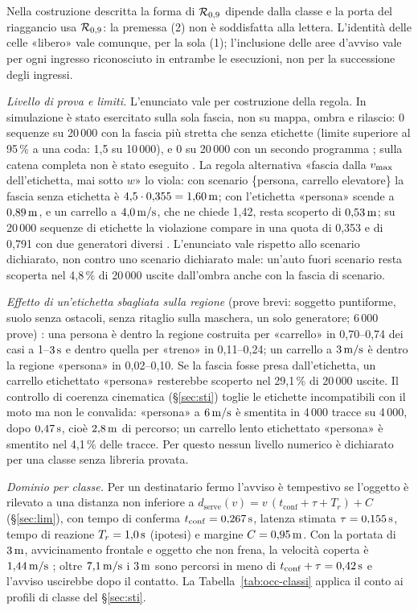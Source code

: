Nella costruzione descritta la forma di $\mathcal{R}_{0,9}$ dipende dalla classe e la porta del riaggancio usa $\mathcal{R}_{0,9}$: la premessa (2) non è soddisfatta alla lettera. L'identità delle celle «libero» vale comunque, per la sola (1); l'inclusione delle aree d'avviso vale per ogni ingresso riconosciuto in entrambe le esecuzioni, non per la successione degli ingressi.

\emph{Livello di prova e limiti.} L'enunciato vale per costruzione della regola. In simulazione è stato esercitato sulla sola fascia, non su mappa, ombra e rilascio: 0 sequenze su 20\,000 con la fascia più stretta che senza etichette (limite superiore al 95\,\% a una coda: 1,5 su 10\,000), e 0 su 20\,000 con un secondo programma ; sulla catena completa non è stato eseguito . La regola alternativa «fascia dalla $v_{\max}$ dell'etichetta, mai sotto $w$» lo viola: con scenario \{persona, carrello elevatore\} la fascia senza etichetta è $4{,}5\cdot0{,}355=1{,}60\,\mathrm{m}$; con l'etichetta «persona» scende a $0{,}89\,\mathrm{m}$, e un carrello a $4{,}0\,\mathrm{m/s}$, che ne chiede 1,42, resta scoperto di $0{,}53\,\mathrm{m}$; su 20\,000 sequenze di etichette la violazione compare in una quota di 0,353 e di 0,791 con due generatori diversi . L'enunciato vale rispetto allo scenario dichiarato, non contro uno scenario dichiarato male: un'auto fuori scenario resta scoperta nel 4,8\,\% di 20\,000 uscite dall'ombra anche con la fascia di scenario.

\emph{Effetto di un'etichetta sbagliata sulla regione} (prove brevi: soggetto puntiforme, suolo senza ostacoli, senza ritaglio sulla maschera, un solo generatore; 6\,000 prove) : una persona è dentro la regione costruita per «carrello» in 0,70--0,74 dei casi a 1--$3\,\mathrm{s}$ e dentro quella per «treno» in 0,11--0,24; un carrello a $3\,\mathrm{m/s}$ è dentro la regione «persona» in 0,02--0,10. Se la fascia fosse presa dall'etichetta, un carrello etichettato «persona» resterebbe scoperto nel 29,1\,\% di 20\,000 uscite. Il controllo di coerenza cinematica (\S\ref{sec:sti}) toglie le etichette incompatibili con il moto ma non le convalida: «persona» a $6\,\mathrm{m/s}$ è smentita in 4\,000 tracce su 4\,000, dopo $0{,}47\,\mathrm{s}$, cioè $2{,}8\,\mathrm{m}$ di percorso; un carrello lento etichettato «persona» è smentito nel 4,1\,\% delle tracce. Per questo nessun livello numerico è dichiarato per una classe senza libreria provata.

\emph{Dominio per classe.} Per un destinatario fermo l'avviso è tempestivo se l'oggetto è rilevato a una distanza non inferiore a $d_{\mathrm{serve}}(v)=v\,(t_{\mathrm{conf}}+\tau+T_r)+C$ (\S\ref{sec:lim}), con tempo di conferma $t_{\mathrm{conf}}=0{,}267\,\mathrm{s}$, latenza stimata $\tau=0{,}155\,\mathrm{s}$, tempo di reazione $T_r=1{,}0\,\mathrm{s}$ (ipotesi) e margine $C=0{,}95\,\mathrm{m}$. Con la portata di $3\,\mathrm{m}$, avvicinamento frontale e oggetto che non frena, la velocità coperta è $1{,}44\,\mathrm{m/s}$ ; oltre $7{,}1\,\mathrm{m/s}$ i $3\,\mathrm{m}$ sono percorsi in meno di $t_{\mathrm{conf}}+\tau=0{,}42\,\mathrm{s}$ e l'avviso uscirebbe dopo il contatto. La Tabella~\ref{tab:occ-classi} applica il conto ai profili di classe del \S\ref{sec:sti}.

